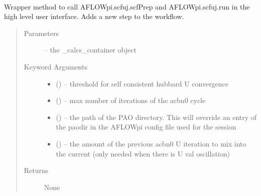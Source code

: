 \documentclass[letterpaper,10pt,english]{sphinxmanual}
\begin{document}

\begin{fulllineitems}
\label{\detokenize{prep:prep.calcs_container}}~

\begin{fulllineitems}
\label{\detokenize{prep:prep.calcs_container.acbn0}}
Wrapper method to call AFLOWpi.scfuj.scfPrep and AFLOWpi.scfuj.run in the high level
user interface. Adds a new step to the workflow.
\begin{quote}\begin{description}
\item[{Parameters}] \leavevmode
{} -- the \_calcs\_container object

\item[{Keyword Arguments}] \leavevmode\begin{itemize}
\item {} 
 () -- threshold for self consistent hubbard U convergence

\item {} 
 () -- max number of iterations of the acbn0 cycle

\item {} 
 () -- the path of the PAO directory. This will override
an entry of the paodir in the AFLOWpi config file
used for the session

\item {} 
 () -- the amount of the previous acbn0 U iteration to mix into
the current (only needed when there is U val oscillation)

\end{itemize}

\item[{Returns}] \leavevmode
None

\end{description}\end{quote}


\end{fulllineitems}
\end{fulllineitems}
\end{document}
